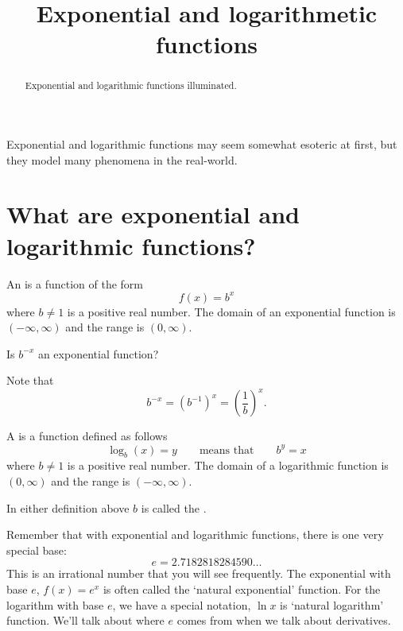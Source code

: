 \documentclass{ximera}
\title[Dig-In:]{Exponential and logarithmetic functions}
\begin{document}
\begin{abstract}
  Exponential and logarithmic functions illuminated.
\end{abstract}
\maketitle

Exponential and logarithmic functions may seem somewhat esoteric at
first, but they model many phenomena in the real-world.




\section{What are exponential and logarithmic functions?}


\begin{definition}
  An  is a function of the form
  \[
  f(x) = b^x
  \]
  where  $b\ne 1$ is a positive real number. The domain of an
  exponential function is $(-\infty,\infty)$ and the range is $(0, \infty)$.
\end{definition}

\begin{question}
  Is $b^{-x}$ an exponential function?
  \begin{multipleChoice}
  \end{multipleChoice}
  \begin{feedback}
    Note that
    \[
    b^{-x} = \left(b^{-1}\right)^x = \left(\frac{1}{b}\right)^x.
    \]
  \end{feedback}
\end{question}


\begin{definition}
  A  is a function defined as follows
  \[
  \log_b(x) = y \qquad\text{means that}\qquad b^y = x
  \]
  where  $b\ne 1$ is a positive real number. The domain of a
  logarithmic function is $(0,\infty)$ and the range is $(- \infty, \infty)$.
\end{definition}

In either definition above $b$ is called the .

Remember that with exponential and logarithmic functions, there is one very special
base:
\[ e = 2.7182818284590\ldots \]
This is an irrational number that you will see frequently.  The exponential with base $e$,
$f(x) = e^x$ is often called the `natural exponential' function.  For the logarithm with base $e$,
we have a special notation, $\ln x$ is `natural logarithm' function.   We'll talk about where $e$
comes from when we talk about derivatives.
\end{document}

